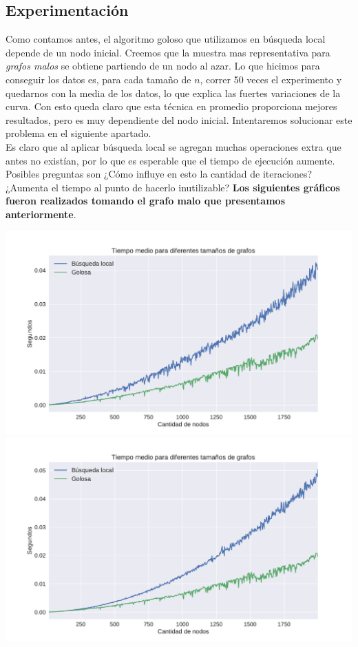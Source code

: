 \subsection{Experimentación}

Como contamos antes, el algoritmo goloso que utilizamos en búsqueda local depende de un nodo inicial. Creemos que la muestra mas representativa para \textit{grafos malos} se obtiene partiendo de un nodo al azar. Lo que hicimos para conseguir los datos es, para cada tamaño de $n$, correr 50 veces el experimento y quedarnos con la media de los datos, lo que explica las fuertes variaciones de la curva. Con esto queda claro que esta técnica en promedio proporciona mejores resultados, pero es muy dependiente del nodo inicial. Intentaremos solucionar este problema en el siguiente apartado. \\

Es claro que al aplicar búsqueda local se agregan muchas operaciones extra que antes no existían, por lo que es esperable que el tiempo de ejecución aumente. Posibles preguntas son ¿Cómo influye en esto la cantidad de iteraciones? ¿Aumenta el tiempo al punto de hacerlo inutilizable? \textbf{Los siguientes gráficos fueron realizados tomando el grafo malo que presentamos anteriormente}.

{\centering
    \includegraphics[width=1\textwidth]{informe/imgs/exp_malo_tiempo_greedy_local.pdf}
}
{\centering
    \includegraphics[width=1\textwidth]{informe/imgs/exp_malo_tiempo_greedy_local_2000.pdf}
}
$ $\newline

